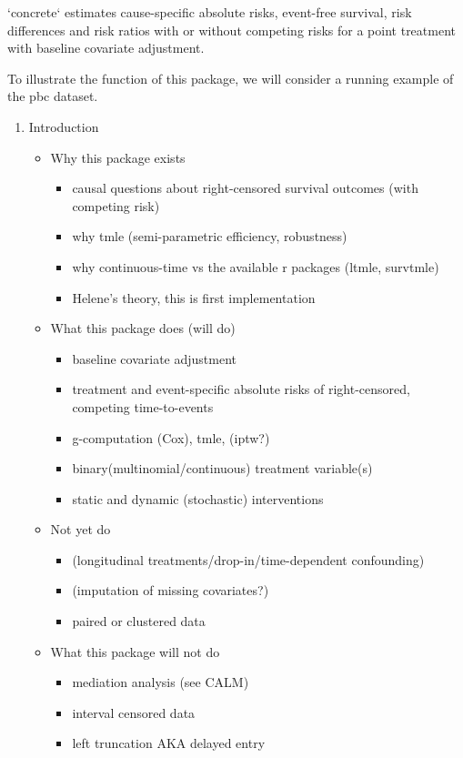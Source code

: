\documentclass{report}
\newcommand{\1}{\ensuremath{\mathbf{1}}}
\begin{document}
`concrete` estimates cause-specific absolute risks, event-free survival, risk differences and risk ratios with or without competing risks for a point treatment with baseline covariate adjustment.

To illustrate the function of this package, we will consider a running example of the pbc dataset.

\begin{enumerate}
\item Introduction
\begin{itemize}
\item Why this package exists
\begin{itemize}
\item causal questions about right-censored survival outcomes (with competing risk)
\item why tmle (semi-parametric efficiency, robustness)
\item why continuous-time vs the available r packages (ltmle, survtmle)
\item Helene's theory, this is first implementation
\end{itemize}

\item What this package does (will do)
\begin{itemize}
\item baseline covariate adjustment
\item treatment and event-specific absolute risks of right-censored, competing time-to-events
\item g-computation (Cox), tmle, (iptw?)
\item binary(multinomial/continuous) treatment variable(s)
\item static and dynamic (stochastic) interventions
\end{itemize}

\item Not yet do
\begin{itemize}
\item (longitudinal treatments/drop-in/time-dependent confounding)
\item (imputation of missing covariates?)
\item paired or clustered data
\end{itemize}

\item What this package will not do
\begin{itemize}
\item mediation analysis (see CALM)
\item interval censored data
\item left truncation AKA delayed entry
\end{itemize}
\end{itemize}


\end{enumerate}
\end{document}
